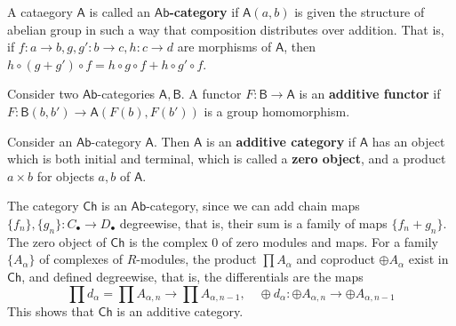 \begin{defn} A cataegory $\mathsf{A}$ is called an \textbf{$\mathsf{Ab}$-category} if $\mathsf{A}(a,b)$ is given the structure of abelian group in such a way that composition distributes over addition. That is, if $f:a\rightarrow b, g,g':b\rightarrow c, h:c\rightarrow d$ are morphisms of $\mathsf{A}$, then $h\circ (g+g')\circ f=h\circ g\circ f+h\circ g'\circ f$.

Consider two $\mathsf{Ab}$-categories $\mathsf{A},\mathsf{B}$. A functor $F:\mathsf{B}\rightarrow \mathsf{A}$ is an \textbf{additive functor} if $F:\mathsf{B}(b,b')\rightarrow \mathsf{A}(F(b),F(b'))$ is a group homomorphism.

Consider an $\mathsf{Ab}$-category $\mathsf{A}$. Then $\mathsf{A}$ is an \textbf{additive category} if $\mathsf{A}$ has an object which is both initial and terminal, which is called a \textbf{zero object}, and a product $a\times b$ for objects $a,b$ of $\mathsf{A}$.
\end{defn}

\begin{exmp} The category $\mathsf{Ch}$ is an $\mathsf{Ab}$-category, since we can add chain maps $\{f_n\},\{g_n\}:C_\bullet\rightarrow D_\bullet$ degreewise, that is, their sum is a family of maps $\{f_n+g_n\}$. The zero object of $\mathsf{Ch}$ is the complex $0$ of zero modules and maps. For a family $\{A_\alpha\}$ of complexes of $R$-modules, the product $\prod A_\alpha$ and coproduct $\oplus A_\alpha$ exist in $\mathsf{Ch}$, and defined degreewise, that is, the differentials are the maps
\begin{equation}
\prod d_\alpha=\prod A_{\alpha,n}\rightarrow \prod A_{\alpha,n-1},\quad \oplus d_\alpha:\oplus A_{\alpha,n}\rightarrow \oplus A_{\alpha,n-1}
\end{equation}
This shows that $\mathsf{Ch}$ is an additive category.
\end{exmp}

